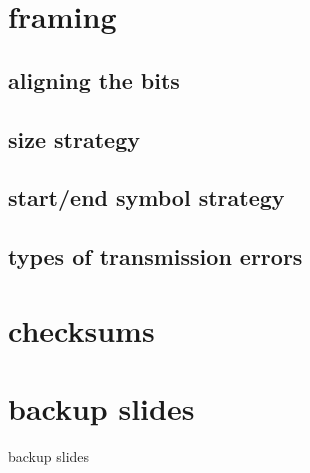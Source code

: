 \date{}
\title{}
\date{}

\begin{frame}
    \titlepage
\end{frame}

\section{framing}

\subsection{aligning the bits}



\subsection{size strategy}



\subsection{start/end symbol strategy}



\subsection{types of transmission errors}



\section{checksums}


\section{backup slides}
\begin{frame}{backup slides}
\end{frame}


